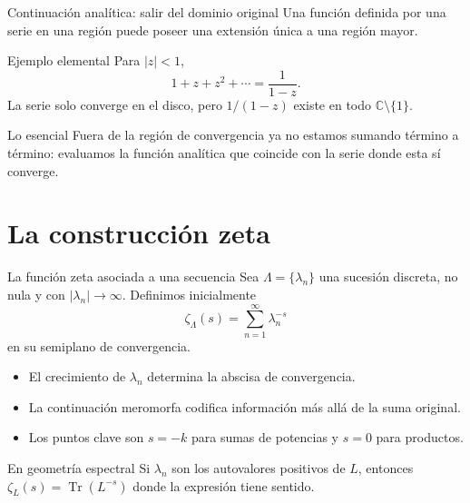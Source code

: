 \documentclass[aspectratio=169,11pt]{beamer}
\begin{document}
\begin{frame}{Continuación analítica: salir del dominio original}
  Una función definida por una serie en una región puede poseer una extensión única a
  una región mayor.
  \pause
  \begin{exampleblock}{Ejemplo elemental}
    Para $|z|<1$,
    \[
      1+z+z^2+\cdots=\frac{1}{1-z}.
    \]
    La serie solo converge en el disco, pero $1/(1-z)$ existe en todo
    $\mathbb C\setminus\{1\}$.
  \end{exampleblock}
  \pause
  \begin{alertblock}{Lo esencial}
    Fuera de la región de convergencia ya no estamos sumando término a término:
    evaluamos la función analítica que coincide con la serie donde esta sí converge.
  \end{alertblock}
\end{frame}

\section{La construcción zeta}

\begin{frame}{La función zeta asociada a una secuencia}
  Sea $\Lambda=\{\lambda_n\}$ una sucesión discreta, no nula y con
  $|\lambda_n|\to\infty$. Definimos inicialmente
  \[
    \boxed{\zeta_\Lambda(s)=\sum_{n=1}^{\infty}\lambda_n^{-s}}
  \]
  en su semiplano de convergencia.
  \pause
  \begin{itemize}[<+->]
    \item El crecimiento de $\lambda_n$ determina la abscisa de convergencia.
    \item La continuación meromorfa codifica información más allá de la suma original.
    \item Los puntos clave son $s=-k$ para sumas de potencias y $s=0$ para productos.
  \end{itemize}
  \pause
  \begin{block}{En geometría espectral}
    Si $\lambda_n$ son los autovalores positivos de $L$, entonces
    $\zeta_L(s)=\operatorname{Tr}(L^{-s})$ donde la expresión tiene sentido.
  \end{block}
\end{frame}
\end{document}
